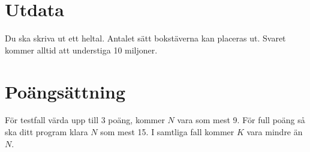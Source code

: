 \section*{Utdata}

Du ska skriva ut ett heltal. Antalet sätt bokstäverna kan
placeras ut. Svaret kommer alltid att understiga 10 miljoner.

\section*{Poängsättning}

För testfall värda upp till $3$ poäng, kommer $N$ vara som mest 9. För full
poäng så ska ditt program klara $N$ som mest 15.  I samtliga fall kommer
$K$ vara mindre än $N$.
